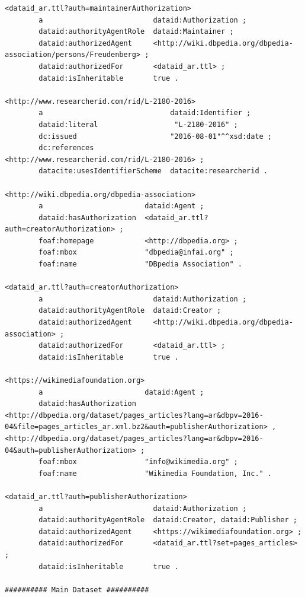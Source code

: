 \documentclass[a4paper,english,twoside,BCOR1.5cm,headsepline,DIV12,appendixprefix,final,12pt]{scrbook}
\begin{document}
\begin{lstlisting}[language=ttl, captionpos=b, label=lst:dcex,linewidth=\columnwidth,breaklines=true,basicstyle=\ttfamily\scriptsize]
<dataid_ar.ttl?auth=maintainerAuthorization>
        a                          dataid:Authorization ;
        dataid:authorityAgentRole  dataid:Maintainer ;
        dataid:authorizedAgent     <http://wiki.dbpedia.org/dbpedia-association/persons/Freudenberg> ;
        dataid:authorizedFor       <dataid_ar.ttl> ;
        dataid:isInheritable       true .

<http://www.researcherid.com/rid/L-2180-2016>
        a                              dataid:Identifier ;
        dataid:literal                  "L-2180-2016" ;
        dc:issued                      "2016-08-01"^^xsd:date ;
        dc:references                  <http://www.researcherid.com/rid/L-2180-2016> ;
        datacite:usesIdentifierScheme  datacite:researcherid .

<http://wiki.dbpedia.org/dbpedia-association>
        a                        dataid:Agent ;
        dataid:hasAuthorization  <dataid_ar.ttl?auth=creatorAuthorization> ;
        foaf:homepage            <http://dbpedia.org> ;
        foaf:mbox                "dbpedia@infai.org" ;
        foaf:name                "DBpedia Association" .

<dataid_ar.ttl?auth=creatorAuthorization>
        a                          dataid:Authorization ;
        dataid:authorityAgentRole  dataid:Creator ;
        dataid:authorizedAgent     <http://wiki.dbpedia.org/dbpedia-association> ;
        dataid:authorizedFor       <dataid_ar.ttl> ;
        dataid:isInheritable       true .
        
<https://wikimediafoundation.org>
        a                        dataid:Agent ;
        dataid:hasAuthorization  <http://dbpedia.org/dataset/pages_articles?lang=ar&dbpv=2016-04&file=pages_articles_ar.xml.bz2&auth=publisherAuthorization> , <http://dbpedia.org/dataset/pages_articles?lang=ar&dbpv=2016-04&auth=publisherAuthorization> ;
        foaf:mbox                "info@wikimedia.org" ;
        foaf:name                "Wikimedia Foundation, Inc." .
        
<dataid_ar.ttl?auth=publisherAuthorization>
        a                          dataid:Authorization ;
        dataid:authorityAgentRole  dataid:Creator, dataid:Publisher ;
        dataid:authorizedAgent     <https://wikimediafoundation.org> ;
        dataid:authorizedFor       <dataid_ar.ttl?set=pages_articles> ;
        dataid:isInheritable       true .
        
########## Main Dataset ##########


\end{lstlisting}
\end{document}
